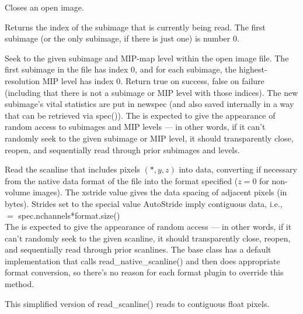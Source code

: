 Closes an open image.
\apiend


Returns the index of the subimage that is currently being read.
The first subimage (or the only subimage, if there is just one) is
number 0.
\apiend



Seek to the given subimage and MIP-map level within the open image file.
The first subimage in the file has index 0, and for each subimage, the
highest-resolution MIP level has index 0.  Return {\kw true} on success,
{\kw false} on failure (including that there is not a subimage or MIP
level with those indices).  The new subimage's vital statistics are put
in {\kw newspec} (and also saved internally in a way that can be
retrieved via {\kw spec()}).  The \ImageInput is expected to give the
appearance of random access to subimages and MIP levels --- in other
words, if it can't randomly seek to the given subimage or MIP level, it
should transparently close, reopen, and sequentially read through prior
subimages and levels.

\apiend


Read the scanline that includes pixels $(*,y,z)$ into {\kw data},
converting if necessary from the native data format of the file into the
{\kw format} specified ($z=0$ for non-volume images).  The {\kw xstride}
value gives the data spacing of adjacent pixels (in bytes).  Strides set
to the special value {\kw AutoStride} imply contiguous data, i.e., \\
   $=$ {\kw spec.nchannels*format.size()} \\
The \ImageInput is expected to give the appearance of random access
--- in other words, if it can't randomly seek to the given scanline, it
should transparently close, reopen, and sequentially read through prior
scanlines.  The base \ImageInput class has a default implementation
that calls {\kw read_native_scanline()} and then does appropriate format
conversion, so there's no reason for each format plugin to override this
method.
\apiend

This simplified version of {\kw read_scanline()} reads to contiguous 
float pixels.
\apiend

